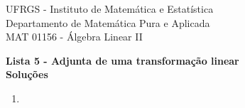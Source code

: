 \documentclass{article}
\begin{document}
\begin{flushleft}
    UFRGS - Instituto de Matemática e Estatística \\
    Departamento de Matemática Pura e Aplicada \\
    MAT 01156 - Álgebra Linear II \\
\end{flushleft}
\vspace{0.25cm}

\begin{center}
    {\LARGE \textbf{Lista 5 - Adjunta de uma transformação linear}} \\
    \vspace{0.4cm}
    {\large \textbf{Soluções}}

\end{center}

\begin{enumerate}
    \item 
\end{enumerate}
\end{document}
